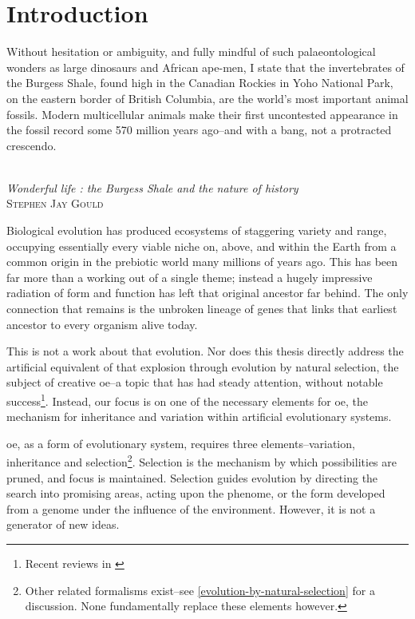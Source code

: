 \chapter{Introduction}\label{introduction}

\settowidth{\epigraphwidth}{Wonderful life : the Burgess Shale and the nature of history}
\epigraph{%
Without hesitation or ambiguity, and fully mindful of such palaeontological wonders as large dinosaurs and African ape-men, I state that the invertebrates of the Burgess Shale, found high in the Canadian Rockies in Yoho National Park, on the eastern border of British Columbia, are the world's most important animal fossils. Modern multicellular animals make their first uncontested appearance in the fossil record some 570 million years ago--and with a bang, not a protracted crescendo.}%
{\textit{\\Wonderful life : the Burgess Shale and the nature of history}\\\textsc{Stephen Jay Gould}}

Biological evolution has produced ecosystems of staggering variety and range, occupying essentially every viable niche on, above, and within the Earth from a common origin in the prebiotic world many millions of years ago. This has been far more than a working out of a single theme; instead a hugely impressive radiation of form and function has left that original ancestor far behind. The only connection that remains is the unbroken lineage of genes that links that earliest ancestor to every organism alive today.

This is not a work about that evolution. Nor does this thesis directly address the artificial equivalent of that explosion through evolution by natural selection, the subject of creative \gls{oe}--a topic that has had steady attention, without notable success\footnote{Recent reviews in \cite{BanzhafBaumgaertnerBeslonEtAl2016}}. Instead, our focus is on one of the necessary elements for \gls{oe}, the mechanism for inheritance and variation within artificial evolutionary systems.

\Gls{oe}, as a form of evolutionary system, requires three elements--variation, inheritance and selection\footnote{Other related formalisms exist--see \cref{evolution-by-natural-selection} for a discussion. None fundamentally replace these elements however.}. Selection is the mechanism by which possibilities are pruned, and focus is maintained. Selection guides evolution by directing the search into promising areas, acting upon the phenome, or the form developed from a genome under the influence of the environment. However, it is not a generator of new ideas. 

